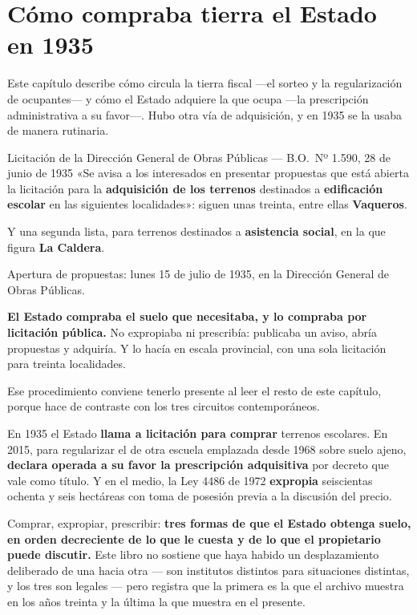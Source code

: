 \section{Cómo compraba tierra el Estado en 1935}

Este capítulo describe cómo circula la tierra fiscal ---el sorteo y la regularización de ocupantes--- y cómo el Estado adquiere la que ocupa ---la prescripción administrativa a su favor---. Hubo otra vía de adquisición, y en
1935 se la usaba de manera rutinaria.

\begin{ficha}{Licitación de la Dirección General de Obras Públicas --- B.O.\ Nº 1.590, 28 de junio de 1935}
«Se avisa a los interesados en presentar propuestas que está abierta la licitación para la
\textbf{adquisición de los terrenos} destinados a \textbf{edificación escolar} en las
siguientes localidades»: siguen unas treinta, entre ellas \textbf{Vaqueros}.

Y una segunda lista, para terrenos destinados a \textbf{asistencia social}, en la que figura
\textbf{La Caldera}.

Apertura de propuestas: lunes 15 de julio de 1935, en la Dirección General de Obras Públicas.
\end{ficha}

\textbf{El Estado compraba el suelo que necesitaba, y lo compraba por licitación pública.} No
expropiaba ni prescribía: publicaba un aviso, abría propuestas y adquiría. Y lo hacía en
escala provincial, con una sola licitación para treinta localidades.

Ese procedimiento conviene tenerlo presente al leer el resto de este capítulo, porque hace de
contraste con los tres circuitos contemporáneos.

En 1935 el Estado \textbf{llama a licitación para comprar} terrenos escolares. En 2015, para regularizar el de
otra escuela emplazada desde 1968 sobre suelo ajeno, \textbf{declara operada a su favor la
prescripción adquisitiva} por decreto que vale como título. Y en el medio, la Ley 4486 de
1972 \textbf{expropia} seiscientas ochenta y seis hectáreas con toma de posesión previa a la
discusión del precio.

Comprar, expropiar, prescribir: \textbf{tres formas de que el Estado obtenga suelo, en orden
decreciente de lo que le cuesta y de lo que el propietario puede discutir.} Este libro no
sostiene que haya habido un desplazamiento deliberado de una hacia otra --- son institutos
distintos para situaciones distintas, y los tres son legales --- pero registra que la primera
es la que el archivo muestra en los años treinta y la última la que muestra en el presente.

